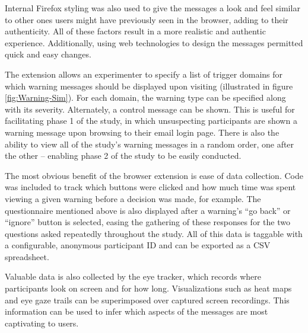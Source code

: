 Internal Firefox styling was also used to give the messages a look and feel similar to other ones users might have previously seen in the browser, adding to their authenticity. All of these factors result in a more realistic and authentic experience. Additionally, using web technologies to design the messages permitted quick and easy changes.

The extension allows an experimenter to specify a list of trigger domains for which warning messages should be displayed upon visiting (illustrated in figure \ref{fig:Warning-Sim}). For each domain, the warning type can be specified along with its severity. Alternately, a control message can be shown. This is useful for facilitating phase 1 of the study, in which unsuspecting participants are shown a warning message upon browsing to their email login page. There is also the ability to view all of the study's warning messages in a random order, one after the other -- enabling phase 2 of the study to be easily conducted.

The most obvious benefit of the browser extension is ease of data collection. Code was included to track which buttons were clicked and how much time was spent viewing a given warning before a decision was made, for example. The questionnaire mentioned above is also displayed after a warning's ``go back'' or ``ignore'' button is selected, easing the gathering of these responses for the two questions asked repeatedly throughout the study. All of this data is taggable with a configurable, anonymous participant ID and can be exported as a CSV spreadsheet.

Valuable data is also collected by the eye tracker, which records where participants look on screen and for how long. Visualizations such as heat maps and eye gaze trails can be superimposed over captured screen recordings. This information can be used to infer which aspects of the messages are most captivating to users.
